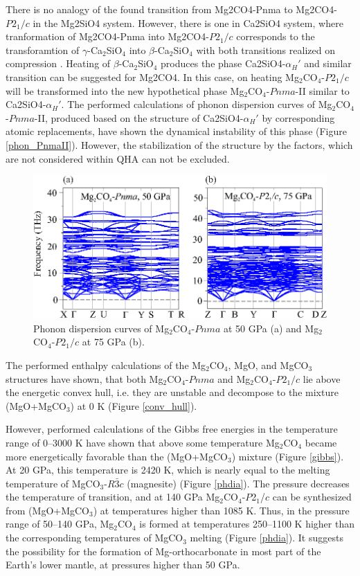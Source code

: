 \documentclass[a4paperm]{article}
\begin{document}
There is no analogy of the found transition from Mg2CO4-Pnma to Mg2CO4-$P2_1/c$ in the Mg2SiO4 system.
However, there is one in Ca2SiO4 system, where tranformation of Mg2CO4-Pnma into Mg2CO4-$P2_1/c$ corresponds to the transforamtion of $\gamma$-Ca$_2$SiO$_4$ into $\beta$-Ca$_2$SiO$_4$ with both transitions realized on compression \cite{belmonte2017}.
Heating of $\beta$-Ca$_2$SiO$_4$ produces the phase Ca2SiO4-$\alpha_H'$ and similar transition can be suggested for Mg2CO4.
In this case, on heating Mg$_2$CO$_4$-$P2_1/c$ will be transformed into the new hypothetical phase Mg$_2$CO$_4$-$Pnma$-II similar to Ca2SiO4-$\alpha_H'$.
The performed calculations of phonon dispersion curves of Mg$_2$CO$_4$-$Pnma$-II, produced based on the structure of Ca2SiO4-$\alpha_H'$ by corresponding atomic replacements, have shown the dynamical instability of this phase (Figure \ref{phon_PnmaII}).
However, the stabilization of the structure by the factors, which are not considered within QHA can not be excluded.


\begin{figure}[h]
	\includegraphics[width=\textwidth]{phon_mg} \centering
	\caption{Phonon dispersion curves of Mg$_2$CO$_4$-$Pnma$ at 50 GPa (a) and Mg$_2$CO$_4$-$P2_1/c$ at 75 GPa (b).} 	\label{phon_mg2co4_main}
\end{figure}

The performed enthalpy calculations of the Mg$_2$CO$_4$, MgO, and MgCO$_3$ structures have shown, that both Mg$_2$CO$_4$-$Pnma$ and Mg$_2$CO$_4$-$P2_1/c$ lie above the energetic convex hull, i.e. they are unstable and decompose to the mixture (MgO+MgCO$_3$) at 0 K (Figure \ref{conv_hull}). 

However, performed calculations of the Gibbs free energies in the temperature range of 0--3000 K have shown that above some temperature  Mg$_2$CO$_4$ became more energetically favorable than the (MgO+MgCO$_3$) mixture (Figure \ref{gibbs}).
At 20 GPa, this temperature is 2420 K, which is nearly equal to the melting temperature of MgCO$_3$-$R\bar{3}c$ (magnesite) \cite{solopova2015} (Figure \ref{phdia}).
The pressure decreases the temperature of transition, and at 140 GPa Mg$_2$CO$_4$-$P$2$_1$/$c$ can be synthesized from (MgO+MgCO$_3$) at temperatures higher than 1085 K.
Thus, in the pressure range of 50--140 GPa, Mg$_2$CO$_4$ is formed at temperatures 250--1100 K higher than the corresponding temperatures of MgCO$_3$ melting (Figure \ref{phdia}). 
It suggests the possibility for the formation of Mg-orthocarbonate in most part of the Earth's lower mantle, at pressures higher than 50 GPa.
\end{document}
